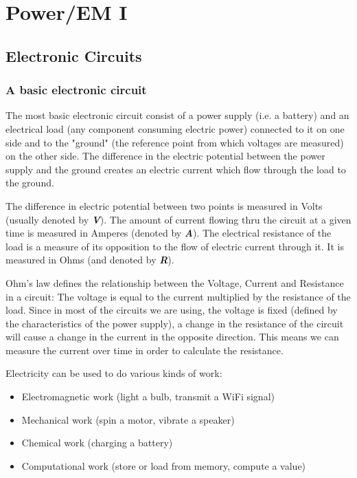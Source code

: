 \chapter{Power/EM I} \label{c4_forthchapter:cha}

\section{Electronic Circuits}
\subsection{A basic electronic circuit}
The most basic electronic circuit consist of a power supply 
(i.e. a battery) and an electrical load (any component consuming electric power) 
connected to it on one side and to the "ground" (the reference point from 
which voltages are measured) on the other side.
The difference in the electric potential between the power supply and the ground
creates an electric current which flow through the load to the ground.

The difference in electric potential between two points is measured in Volts 
(usually denoted by \textbf{\textit{V}}). The amount of current flowing thru
the circuit at a given time is measured in Amperes (denoted by \textbf{\textit{A}}).
The electrical resistance of the load is a measure of its opposition to the flow 
of electric current through it. It is measured in Ohms (and denoted by \textbf{\textit{R}}).

Ohm's law defines the relationship between the Voltage, Current and Resistance in a circuit:
The voltage is equal to the current multiplied by the resistance of the load.
Since in most of the circuits we are using, the voltage is fixed 
(defined by the characteristics of the power supply), a change in the resistance
of the circuit will cause a change in the current in the opposite direction.
This means we can measure the current over time in order to calculate the resistance.


Electricity can be used to do various kinds of work:
\begin{itemize}
    \item Electromagnetic work (light a bulb, transmit a WiFi signal)
    \item Mechanical work (spin a motor, vibrate a speaker)
    \item Chemical work (charging a battery)
    \item Computational work (store or load from memory, compute a value)
\end{itemize}

